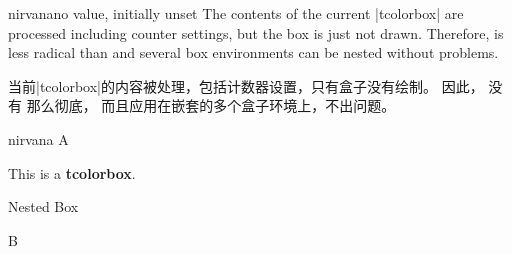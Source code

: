 
\begin{docTcbKey}[][doc new=2019-03-01]{nirvana}{}{no value, initially unset}
The contents of the current |tcolorbox| are processed including counter
settings, but the box is just not drawn.
Therefore,  is less radical than 
and several box environments can be nested without problems.

当前|tcolorbox|的内容被处理，包括计数器设置，只有盒子没有绘制。%
因此，  没有  那么彻底，%
而且应用在嵌套的多个盒子环境上，不出问题。
\begin{exdispExample}{nirvana}
A%
\begin{tcolorbox}[
    title=This box is completely removed by the following key,
    nirvana
]
This is a \textbf{tcolorbox}.
\begin{tcolorbox}
Nested Box
\end{tcolorbox}
\end{tcolorbox}%
B
\end{exdispExample}
\end{docTcbKey}